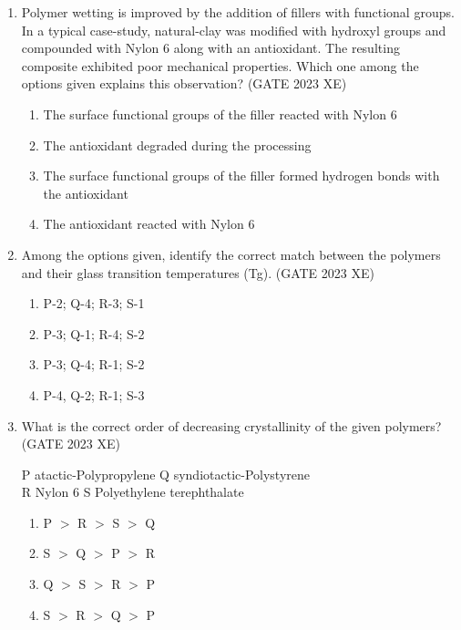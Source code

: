 \documentclass[journal,12pt,onecolumn]{IEEEtran}
\begin{document}
\begin{enumerate}
\item Polymer wetting is improved by the addition of fillers with functional groups. In a typical case-study, natural-clay was modified with hydroxyl groups and compounded with Nylon 6 along with an antioxidant. The resulting composite exhibited poor mechanical properties. Which one among the options given explains this observation?
\hfill{(GATE 2023 XE)}

\begin{multicols}{2}
\begin{enumerate}
\item The surface functional groups of the filler reacted with Nylon 6
\item The antioxidant degraded during the processing
\item The surface functional groups of the filler formed hydrogen bonds with the antioxidant
\item The antioxidant reacted with Nylon 6
\end{enumerate}
\end{multicols}

\item Among the options given, identify the correct match between the polymers and their glass transition temperatures (Tg).
\hfill{(GATE 2023 XE)}



\begin{multicols}{2}
\begin{enumerate}
\item P-2; Q-4; R-3; S-1
\item P-3; Q-1; R-4; S-2
\item P-3; Q-4; R-1; S-2
\item P-4, Q-2; R-1; S-3
\end{enumerate}
\end{multicols}

\item What is the correct order of decreasing crystallinity of the given polymers?
\hfill{(GATE 2023 XE)}

P\; atactic-Polypropylene \quad Q\; syndiotactic-Polystyrene \\
R\; Nylon 6 \quad S\; Polyethylene terephthalate

\begin{multicols}{2}
\begin{enumerate}
\item P $>$ R $>$ S $>$ Q
\item S $>$ Q $>$ P $>$ R
\item Q $>$ S $>$ R $>$ P
\item S $>$ R $>$ Q $>$ P
\end{enumerate}
\end{multicols}


\end{enumerate}
\end{document}
